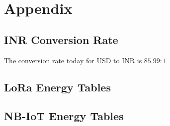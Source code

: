 \section{Appendix}
\subsection{INR Conversion Rate}\label{conv:Rupee} 
The conversion rate today for USD to INR is $85.99:1$

\subsection{LoRa Energy Tables}





\subsection{NB-IoT Energy Tables}
